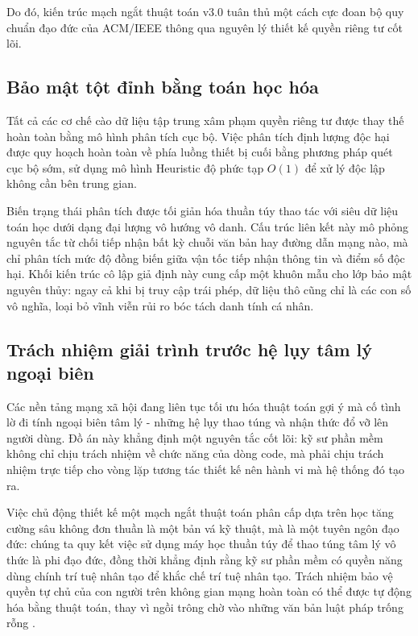 Do đó, kiến trúc mạch ngắt thuật toán v3.0 tuân thủ một cách cực đoan bộ quy chuẩn đạo đức của ACM/IEEE \cite{acm_ethics, ieee_ethics} thông qua nguyên lý thiết kế quyền riêng tư cốt lõi. 

\subsection{Bảo mật tột đỉnh bằng toán học hóa}

Tất cả các cơ chế cào dữ liệu tập trung xâm phạm quyền riêng tư được thay thế hoàn toàn bằng mô hình phân tích cục bộ. Việc phân tích định lượng độc hại được quy hoạch hoàn toàn về phía luồng thiết bị cuối bằng phương pháp quét cục bộ sớm, sử dụng mô hình Heuristic độ phức tạp $O(1)$ để xử lý độc lập không cần bên trung gian.

Biến trạng thái phân tích được tối giản hóa thuần túy thao tác với siêu dữ liệu toán học dưới dạng đại lượng vô hướng vô danh. Cấu trúc liên kết này mô phỏng nguyên tắc từ chối tiếp nhận bất kỳ chuỗi văn bản hay đường dẫn mạng nào, mà chỉ phân tích mức độ đồng biến giữa vận tốc tiếp nhận thông tin và điểm số độc hại. Khối kiến trúc cô lập giả định này cung cấp một khuôn mẫu cho lớp bảo mật nguyên thủy: ngay cả khi bị truy cập trái phép, dữ liệu thô cũng chỉ là các con số vô nghĩa, loại bỏ vĩnh viễn rủi ro bóc tách danh tính cá nhân.

\subsection{Trách nhiệm giải trình trước hệ lụy tâm lý ngoại biên}

Các nền tảng mạng xã hội đang liên tục tối ưu hóa thuật toán gợi ý mà cố tình lờ đi tính ngoại biên tâm lý - những hệ lụy thao túng và nhận thức đổ vỡ lên người dùng. Đồ án này khẳng định một nguyên tắc cốt lõi: kỹ sư phần mềm không chỉ chịu trách nhiệm về chức năng của dòng code, mà phải chịu trách nhiệm trực tiếp cho vòng lặp tương tác thiết kế nên hành vi mà hệ thống đó tạo ra.

Việc chủ động thiết kế một mạch ngắt thuật toán phân cấp dựa trên học tăng cường sâu không đơn thuần là một bản vá kỹ thuật, mà là một tuyên ngôn đạo đức: chúng ta quy kết việc sử dụng máy học thuần túy để thao túng tâm lý vô thức là phi đạo đức, đồng thời khẳng định rằng kỹ sư phần mềm có quyền năng dùng chính trí tuệ nhân tạo để khắc chế trí tuệ nhân tạo. Trách nhiệm bảo vệ quyền tự chủ của con người trên không gian mạng hoàn toàn có thể được tự động hóa bằng thuật toán, thay vì ngồi trông chờ vào những văn bản luật pháp trống rỗng \cite{eu_dsa, vn_cybersec}.

